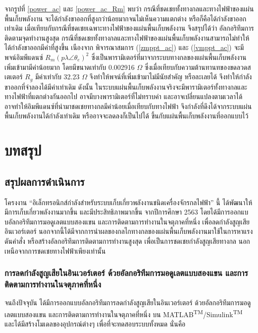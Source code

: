 \documentclass[11pt,a4paper]{article}
\begin{document}
จากรูปที่ \ref{power_ac} และ \ref{power_ac_Rm} พบว่า กรณีที่ชดเชยทั้งทางกลและทางไฟฟ้าของแผ่นพื้นเก็บพลังงาน จะได้กำลังขาออกที่สูงกว่าน้อยมากจนไม่เห็นความแตกต่าง หรือก็คือได้กำลังขาออกเท่าเดิม เมื่อเทียบกับกรณีที่ชดเชยเฉพาะทางไฟฟ้าของแผ่นพื้นเก็บพลังงาน
จึงสรุปได้ว่า อัลกอริทึมการติดตามจุดทำงานสูงสุด กรณีที่ชดเชยทั้งทางกลและทางไฟฟ้าของแผ่นพื้นเก็บพลังงานสามารถไม่ทำให้ได้กำลังขาออกมีค่าที่สูงขึ้น เนืองจาก พิจารณาสมการ (\ref{zmppt_ac}) และ (\ref{vmppt_ac}) จะมีพจน์อิมพีแดนซ์ $R_{m}(p\lambda \angle \theta_{e})^2$
ซึ่งเป็นพารามิเตอร์ที่มาจากระบบทางกลของแผ่นพื้นเก็บพลังงานเพิ่มเข้ามามีค่าน้อยมาก โดยมีขนาดเท่ากับ 0.002916 $\Omega$ ซึ่งเมื่อเทียบกับความต้านทานทของขดลวดสเตเตอร์ $R_{g}$ มีค่าเท่ากับ 32.23 $\Omega$ จึงทำให้พจน์ที่เพิ่มเข้ามาไม่มีนัยสำคัญ หรือละเลยได้ จึงทำให้กำลังขาออกที่จำลองได้มีค่าเท่าเดิม
ดังนั้น ในระบบแผ่นพื้นเก็บพลังงานจริงจะมีพารามิเตอร์ทั้งทางกลและทางไฟฟ้าที่แตกต่างกันออกไป อาจมีบางพารามิเตอร์ที่ไม่ทราบค่า และอาจเปลี่ยนแปลงตามเวลาได้ อาจทำให้อิมพีแดนซ์ที่นำมาชดเชยทางกลมีค่าน้อยเมื่อเทียบกับทางไฟฟ้า จึงกำลังที่ดึงได้จากระบบแผ่นพื้นเก็บพลังงานได้กำลังเท่าเดิม หรืออาจจะลดลงก็เป็นไปได้ ขึ้นกับแผ่นพื้นเก็บพลังงานที่ออกแบบไว้

\newpage
\section{บทสรุป}
\subsection{สรุปผลการดำเนินการ}
โครงงาน “อิเล็กทรอนิกส์กำลังสำหรับระบบเก็บเกี่ยวพลังงานชนิดเครื่องจักรกลไฟฟ้า” นี้ ได้พัฒนาให้มีการเก็บเกี่ยวพลังงานมากขึ้น และมีประสิทธิภาพมากขึ้น จากปีการศึกษา 2563 โดยได้มีการออกแบบอัลกอริทึมการมอดูเลตแบบสองแขน และการติดตามการทำงานในจตุภาคที่หนึ่ง เพื่อลดกำลังสูญเสียอินเวอร์เตอร์ นอกจากนี้ได้มีจากการนำผลของกลไกทางกลของแผ่นพื้นเก็บพลังงานมาใช้ในการหาแรงดันคำสั่ง หรือสร้างอัลกอริทึมการติดตามการทำงานสูงสุด เพื่อเป็นการชดเชยกำลังสูญเสียทางกล นอกเหนือจากการชดเชยทางไฟฟ้าเพียงเท่านั้น

\subsubsection{การลดกำลังสูญเสียในอินเวอร์เตอร์ ด้วยอัลกอริทึมการมอดูเลตแบบสองแขน และการติดตามการทำงานในจตุภาคที่หนึ่ง}

จนถึงปัจจุบัน ได้มีการออกแบบอัลกอริทึมการลดกำลังสูญเสียในอินเวอร์เตอร์ ด้วยอัลกอริทึมการมอดูเลตแบบสองแขน และการติดตามการทำงานในจตุภาคที่หนึ่ง บน MATLAB\textsuperscript{TM}/Simulink\textsuperscript{TM} และได้มีสร้างโมเดลของอุปกรณ์ต่างๆ เพื่อที่จะทดสอบระบบทั้งหมด นั่นคือ
\end{document}
